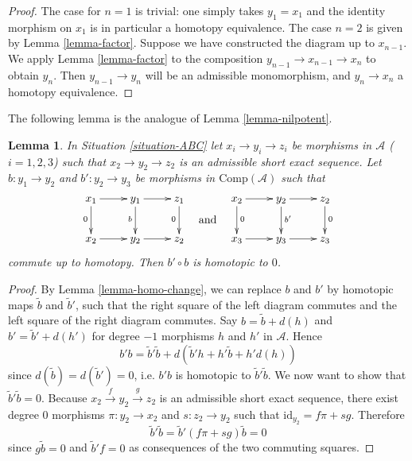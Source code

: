 \documentclass{stacks-project}
\theoremstyle{plain}
\newtheorem{lemma}[subsection]{Lemma}
\theoremstyle{definition}
\theoremstyle{remark}
\numberwithin{equation}{subsection}
\begin{document}
\begin{proof}
The case for $n=1$ is trivial: one simply takes $y_1 = x_1$ and the
identity morphism on $x_1$ is in particular a homotopy equivalence.
The case $n = 2$ is given by Lemma \ref{lemma-factor}. Suppose we have
constructed the diagram up to $x_{n - 1}$. We apply
Lemma \ref{lemma-factor} to the composition
$y_{n - 1} \to x_{n-1} \to x_n$ to obtain $y_n$. Then
$y_{n - 1} \to y_n$ will be an admissible monomorphism, and
$y_n \to x_n$ a homotopy equivalence.
\end{proof}

\noindent
The following lemma is the analogue of Lemma \ref{lemma-nilpotent}.

\begin{lemma}
\label{lemma-triseq}
In Situation \ref{situation-ABC} let $x_i \to y_i \to z_i$
be morphisms in $\mathcal{A}$ ($i=1,2,3$) such that
$x_2 \to y_2\to z_2$ is an admissible short exact sequence.
Let $b : y_1 \to y_2$ and $b' : y_2\to y_3$ be morphisms
in $\text{Comp}(\mathcal{A})$ such that
$$
\vcenter{
\xymatrix{
x_1 \ar[d]_0 \ar[r] &
y_1 \ar[r] \ar[d]_b &
z_1 \ar[d]_0 \\
x_2 \ar[r] & y_2 \ar[r] & z_2
}
}
\quad\text{and}\quad
\vcenter{
\xymatrix{
x_2 \ar[d]^0 \ar[r] &
y_2 \ar[r] \ar[d]^{b'} &
z_2 \ar[d]^0 \\
x_3 \ar[r] & y_3 \ar[r] & z_3
}
}
$$
commute up to homotopy. Then $b'\circ b$ is homotopic to $0$.
\end{lemma}

\begin{proof}
By Lemma \ref{lemma-homo-change}, we can replace $b$ and $b'$
by homotopic maps $\tilde{b}$ and $\tilde{b}'$, such that the right
square of the left diagram commutes and the left square of the right
diagram commutes. Say $b = \tilde{b} + d(h)$ and $b'=\tilde{b}'+d(h')$
for degree $-1$ morphisms $h$ and $h'$ in $\mathcal{A}$. Hence
$$
b'b = \tilde{b}'\tilde{b} + d(\tilde{b}'h + h'\tilde{b} + h'd(h))
$$
since $d(\tilde{b})=d(\tilde{b}')=0$, i.e. $b'b$ is homotopic to
$\tilde{b}'\tilde{b}$. We now want to show that $\tilde{b}'\tilde{b}=0$.
Because $x_2\xrightarrow{f} y_2\xrightarrow{g} z_2$ is an admissible
short exact sequence, there exist degree $0$ morphisms
$\pi : y_2 \to x_2$ and $s : z_2 \to y_2$ such that
$\text{id}_{y_2} = f\pi + sg$. Therefore
$$
\tilde{b}'\tilde{b} = \tilde{b}'(f\pi + sg)\tilde{b} = 0
$$
since $g\tilde{b} = 0$ and $\tilde{b}'f = 0$ as consequences
of the two commuting squares.
\end{proof}
\end{document}
